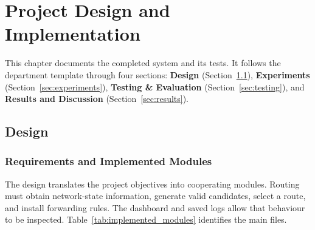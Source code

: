 \documentclass[12pt,a4paper,oneside]{report}
\begin{document}
\chapter{Project Design and Implementation}
\label{chap:project}

This chapter documents the completed system and its tests. It follows the department template through four sections: \textbf{Design} (Section~\ref{sec:design}), \textbf{Experiments} (Section~\ref{sec:experiments}), \textbf{Testing \& Evaluation} (Section~\ref{sec:testing}), and \textbf{Results and Discussion} (Section~\ref{sec:results}).

\section{Design}
\label{sec:design}

\subsection{Requirements and Implemented Modules}
The design translates the project objectives into cooperating modules. Routing must obtain network-state information, generate valid candidates, select a route, and install forwarding rules. The dashboard and saved logs allow that behaviour to be inspected. Table~\ref{tab:implemented_modules} identifies the main files.
\end{document}
